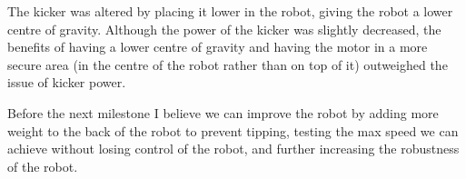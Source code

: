 \documentclass[12pt]{article}
\begin{document}
\begin{flushleft}
The kicker was altered by placing it lower in the robot, giving the robot a lower centre of gravity. Although the power of the kicker was slightly decreased, the benefits of having a lower centre of gravity and having the motor in a more secure area (in the centre of the robot rather than on top of it) outweighed the issue of kicker power. \linebreak

Before the next milestone I believe we can improve the robot by adding more weight to the back of the robot to prevent tipping, testing the max speed we can achieve without losing control of the robot, and further increasing the robustness of the robot.  \linebreak
\end{flushleft}
\end{document}
